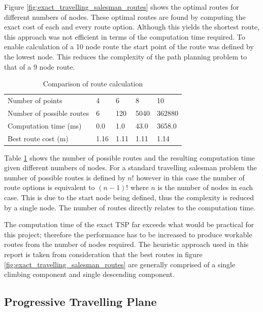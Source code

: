 \documentclass[a4paper,12pt,twoside]{article}
\begin{document}
Figure \ref{fig:exact_travelling_salesman_routes} shows the optimal routes for different numbers of nodes. These optimal routes are found by computing the exact cost of each and every route option. Although this yields the shortest route, this approach was not efficient in terms of the computation time required. To enable calculation of a 10 node route the start point of the route was defined by the lowest node. This reduces the complexity of the path planning problem to that of a 9 node route. 

\begin{table}[width=\textwidth]
\centering

    \begin{tabular}{lllll}
    Number of points	& 4	& 6	& 8	& 10	\\
Number of possible routes	& 6	& 120	& 5040	& 362880	\\
Computation time (ms)	& 0.0	& 1.0	& 43.0	& 3658.0	\\
Best route cost (m)	& 1.16	& 1.11	& 1.11	& 1.14	\\

    \end{tabular}
\caption{Comparison of route calculation}
\label{tbl:comparison_of_route_calculation}
\end{table}

Table \ref{tbl:comparison_of_route_calculation} shows the number of possible routes and the resulting computation time given different numbers of nodes. For a standard travelling salesman problem the number of possible routes is defined by $n!$ however in this case the number of route options is equivalent to $(n-1)!$ where $n$ is the number of nodes in each case. This is due to the start node being defined, thus the complexity is reduced by a single node. The number of routes directly relates to the computation time.

The computation time of the exact TSP far exceeds what would be practical for this project; therefore the performance has to be increased to produce workable routes from the number of nodes required. The heuristic approach used in this report is taken from consideration that the best routes in figure \ref{fig:exact_travelling_salesman_routes} are generally comprised of a single climbing component and single descending component.

\subsection{Progressive Travelling Plane}
\label{sec:progressive_travelling_plane}
\end{document}
